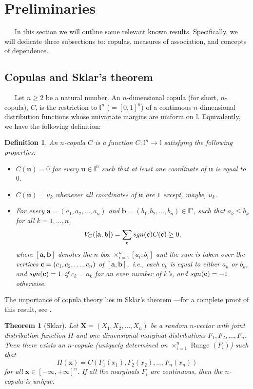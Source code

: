 \documentclass[11pt,a4paper]{article}
\newcommand{\I}{\mbox{${\rm I\!I}$}}
\newtheorem{theorem}{Theorem}
\newtheorem{definition}{Definition}
\def\XX{{\mathbf X}}
\def\xx{{\mathbf x}}
\def\uu{{\mathbf u}}
\def\aa{{\mathbf a}}
\def\bb{{\mathbf b}}
\def\I{{\mathbb I}}
\begin{document}
\section{Preliminaries}\label{sec:prel}

$\phantom{999}$In this section we will outline some relevant known results. Specifically, we will dedicate three subsections to: copulas, measures of association, and concepts of dependence.

\subsection{Copulas and Sklar's theorem}

$\phantom{999}$Let $n\geq 2$ be a natural number. An $n$-dimensional copula (for short, $n$-copula), $C$, is the restriction to $\I^n$ ($=[0,1]^n$) of a continuous $n$-dimensional distribution functions whose univariate margins are uniform on $\I$. Equivalently, we have the following definition:

\begin{definition}An $n$-copula $C$ is a function $C:\I^n\longrightarrow \I$ satisfying the following properties:
    \begin{itemize}
        \item [i)] $C(\uu)=0$ for every $\uu\in \I^n$ such that at least one coordinate of $\uu$ is equal to $0$.
        \item [ii)] $C(\uu)=u_k$ whenever all coordinates of $\uu$ are $1$ except, maybe, $u_k$.
        \item [iii)] For every $\aa=(a_1,a_2,\ldots,a_n)$ and $\bb=(b_1,b_2,\ldots,b_n)\in \I^n$, such that $a_k\leq b_k$ for all $k=1,\ldots,n$,
        $$V_C([\aa,\bb])=\sum_{{\bf c}}sgn({\bf c})C({\bf c})\geq 0,$$
         where $[\aa,\bb]$ denotes the $n$-box $\times_{i=1}^n[a_i,b_i]$ and the sum is taken over the vertices ${\bf c}=(c_1,c_2,\ldots,c_n)$ of $[\aa,\bb],$ i.e., each $c_k$ is equal to either $a_k$ or $b_k$, and $sgn({\bf c})=1$ if $c_k=a_k$ for an even number of $k$'s, and $sgn({\bf c})=-1$ otherwise.
    \end{itemize}
\end{definition}

The importance of copula theory lies in Sklar's theorem \cite{Sk59} ---for a complete proof of this result, see \cite{Ub2017}.

\begin{theorem}[Sklar]
Let $\XX=(X_1,X_2,...,X_n)$ be a random $n$-vector with joint distribution function $H$ and one-dimensional marginal distributions $F_1,F_2,...,F_n$. Then there exists an $n$-copula (uniquely determined on $\times_{i=1}^n\text{ Range } (F_i)$) such that
$$H(\xx)=C(F_1(x_1),F_2(x_2),...,F_n(x_n))$$
for all $\xx\in[-\infty,+\infty]^n$. If all the marginals $F_i$ are continuous, then the $n$-copula is unique.
\end{theorem}
\end{document}

